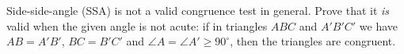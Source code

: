 Side-side-angle (SSA) is not a valid congruence test in general. Prove that it \emph{is} valid when the given angle is not acute: if in triangles $ABC$ and $A'B'C'$ we have $AB=A'B'$, $BC=B'C'$ and $\angle A=\angle A'\ge90^\circ$, then the triangles are congruent.
